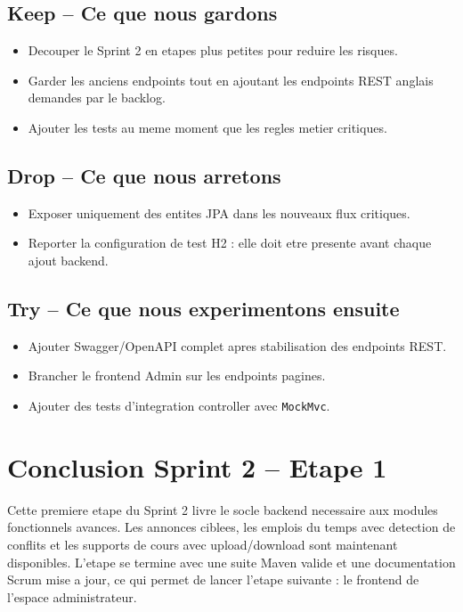 \documentclass[12pt,a4paper]{report}
\begin{document}
\subsection{Keep -- Ce que nous gardons}

\begin{itemize}[itemsep=0.3em]
    \item Decouper le Sprint 2 en etapes plus petites pour reduire les risques.
    \item Garder les anciens endpoints tout en ajoutant les endpoints REST anglais demandes par le backlog.
    \item Ajouter les tests au meme moment que les regles metier critiques.
\end{itemize}

\subsection{Drop -- Ce que nous arretons}

\begin{itemize}[itemsep=0.3em]
    \item Exposer uniquement des entites JPA dans les nouveaux flux critiques.
    \item Reporter la configuration de test H2 : elle doit etre presente avant chaque ajout backend.
\end{itemize}

\subsection{Try -- Ce que nous experimentons ensuite}

\begin{itemize}[itemsep=0.3em]
    \item Ajouter Swagger/OpenAPI complet apres stabilisation des endpoints REST.
    \item Brancher le frontend Admin sur les endpoints pagines.
    \item Ajouter des tests d'integration controller avec \texttt{MockMvc}.
\end{itemize}

\section{Conclusion Sprint 2 -- Etape 1}

Cette premiere etape du Sprint 2 livre le socle backend necessaire aux modules fonctionnels avances. Les annonces ciblees, les emplois du temps avec detection de conflits et les supports de cours avec upload/download sont maintenant disponibles. L'etape se termine avec une suite Maven valide et une documentation Scrum mise a jour, ce qui permet de lancer l'etape suivante : le frontend de l'espace administrateur.
\end{document}

